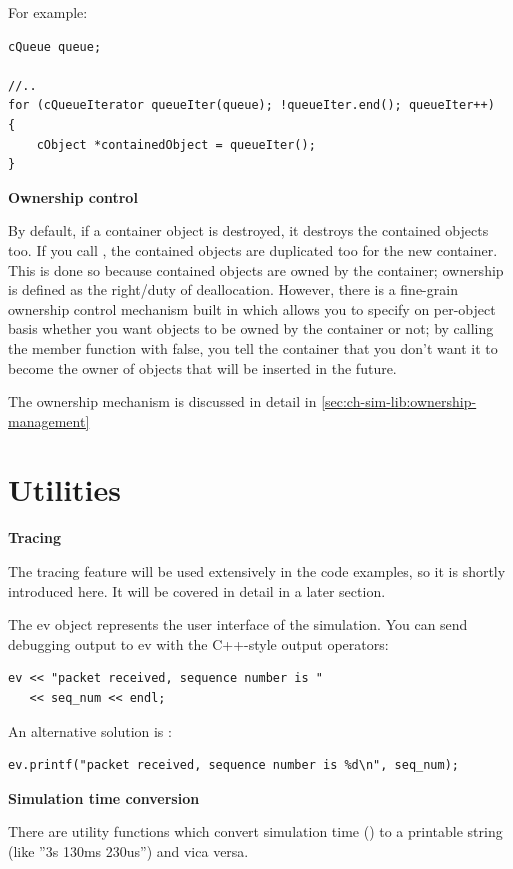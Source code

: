 For example:

\begin{verbatim}
cQueue queue;

//..
for (cQueueIterator queueIter(queue); !queueIter.end(); queueIter++)
{
    cObject *containedObject = queueIter();
}
\end{verbatim}


\textbf{Ownership control}


By default, if a container object is destroyed, it destroys the
contained objects too. If you call , the contained
objects are duplicated too for the new container. This is done so
because contained objects are owned by the container; ownership is
defined as the right/duty of deallocation. However, there is a
fine-grain ownership control mechanism built
in which allows you to specify on per-object basis whether you want
objects to be owned by the container or not; by calling the
 member function with false, you tell the
container that you don't want it to become the owner of objects that
will be inserted in the future.

The ownership mechanism is discussed in detail in
\ref{sec:ch-sim-lib:ownership-management}


\section{Utilities}

\textbf{Tracing}


The tracing feature will be used extensively in the code examples,
so it is shortly introduced here. It will be covered in detail
in a later section.

The ev object represents the user interface of the
simulation.  You can send debugging output to ev with the C++-style
output operators:

\begin{verbatim}
ev << "packet received, sequence number is "
   << seq_num << endl;
\end{verbatim}

An alternative solution is :

\begin{verbatim}
ev.printf("packet received, sequence number is %d\n", seq_num);
\end{verbatim}

\textbf{Simulation time conversion}


There are utility functions which convert simulation
time () to a printable string
(like ''3s 130ms 230us'') and vica versa.



